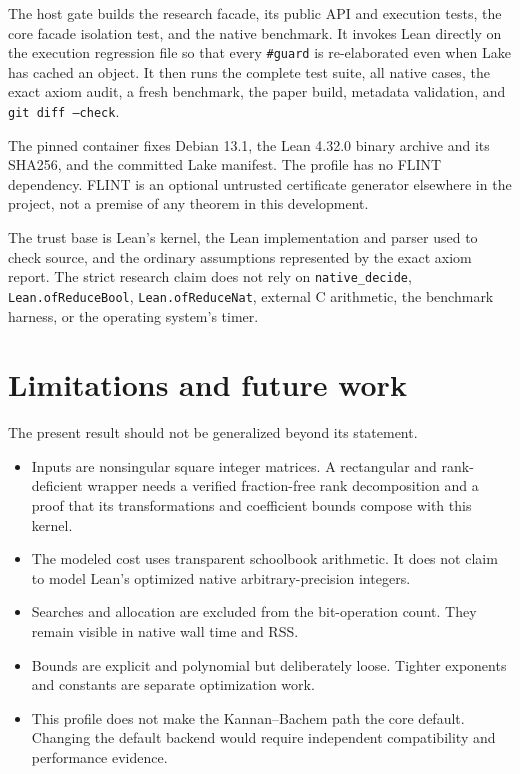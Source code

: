 \documentclass[11pt]{article}
\newcommand{\code}[1]{\texttt{#1}}
\begin{document}
The host gate builds the research facade, its public API and execution tests,
the core facade isolation test, and the native benchmark.  It invokes Lean
directly on the execution regression file so that every \code{\#guard} is
re-elaborated even when Lake has cached an object.  It then runs the complete
test suite, all native cases, the exact axiom audit, a fresh benchmark, the
paper build, metadata validation, and \code{git diff --check}.

The pinned container fixes Debian 13.1, the Lean 4.32.0 binary archive and its
SHA256, and the committed Lake manifest.  The profile has no FLINT dependency.
FLINT is an optional untrusted certificate generator elsewhere in the
project, not a premise of any theorem in this development.

The trust base is Lean's kernel, the Lean implementation and parser used to
check source, and the ordinary assumptions represented by the exact axiom
report.  The strict research claim does not rely on \code{native\_decide},
\code{Lean.ofReduceBool}, \code{Lean.ofReduceNat}, external C arithmetic, the
benchmark harness, or the operating system's timer.

\section{Limitations and future work}

The present result should not be generalized beyond its statement.
\begin{itemize}
  \item Inputs are nonsingular square integer matrices.  A rectangular and
        rank-deficient wrapper needs a verified fraction-free rank
        decomposition and a proof that its transformations and coefficient
        bounds compose with this kernel.
  \item The modeled cost uses transparent schoolbook arithmetic.  It does not
        claim to model Lean's optimized native arbitrary-precision integers.
  \item Searches and allocation are excluded from the bit-operation count.
        They remain visible in native wall time and RSS.
  \item Bounds are explicit and polynomial but deliberately loose.  Tighter
        exponents and constants are separate optimization work.
  \item This profile does not make the Kannan--Bachem path the core default.
        Changing the default backend would require independent compatibility
        and performance evidence.
\end{itemize}
\end{document}
